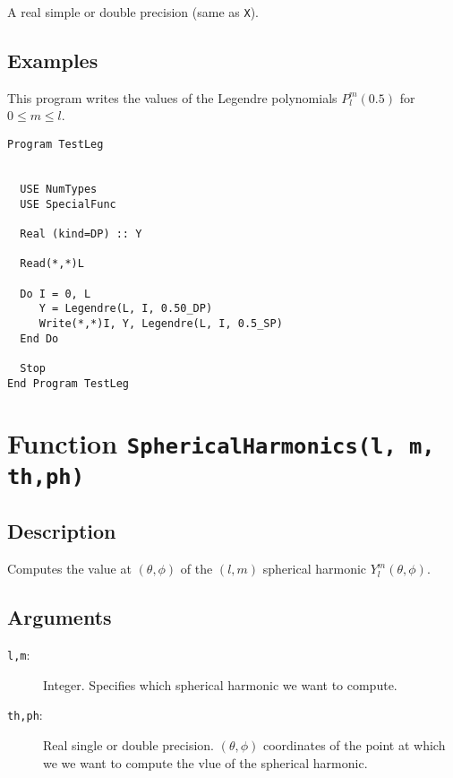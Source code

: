 A real simple or double precision (same as \texttt{X}).

\subsection{Examples}

This program writes the values of the Legendre polynomials
$P_l^m(0.5)$ for $0\le m \le l$.

\begin{lstlisting}[emph=Legendre,
                   emphstyle=\color{blue},
                   frame=trBL,
                   caption=Computing some legendre polynomials.,
                   label=legendre]
Program TestLeg


  USE NumTypes
  USE SpecialFunc

  Real (kind=DP) :: Y

  Read(*,*)L

  Do I = 0, L
     Y = Legendre(L, I, 0.50_DP)
     Write(*,*)I, Y, Legendre(L, I, 0.5_SP)
  End Do

  Stop
End Program TestLeg
\end{lstlisting}

\section{Function \texttt{SphericalHarmonics(l, m, th,ph)}}

\subsection{Description}

Computes the value at $(\theta,\phi)$ of the $(l,m)$ spherical
harmonic $Y_l^m(\theta,\phi)$. 

\subsection{Arguments}

\begin{description}
\item[\texttt{l,m}:] Integer. Specifies which spherical harmonic we
  want to compute.
\item[\texttt{th,ph}:] Real single or double
  precision. $(\theta,\phi)$ coordinates of the point at which we
  we want to compute the vlue of the spherical harmonic.
\end{description}


